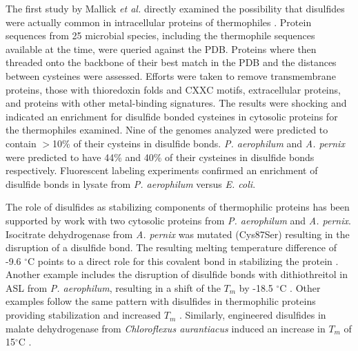 The first study by Mallick \emph{et al.} directly examined the possibility that
disulfides were actually common in intracellular proteins of thermophiles
\cite{mallick2002gei}.  Protein sequences from 25 microbial species, including
the thermophile sequences available at the time, were queried against the PDB.
Proteins where then threaded onto the backbone of their best match in the PDB
and the distances between cysteines were assessed.  Efforts were taken to
remove transmembrane proteins, those with thioredoxin folds and CXXC motifs,
extracellular proteins, and proteins with other metal-binding signatures.  The
results were shocking and indicated an enrichment for disulfide bonded
cysteines in cytosolic proteins for the thermophiles examined.  Nine of the
genomes analyzed were predicted to contain $>$10\% of their cysteins in
disulfide bonds.  \emph{P. aerophilum} and \emph{A.  pernix} were predicted to
have 44\% and 40\% of their cysteines in disulfide bonds respectively.
Fluorescent labeling experiments confirmed an enrichment of disulfide bonds in
lysate from \emph{P.  aerophilum} versus \emph{E. coli}.


The role of disulfides as stabilizing components of thermophilic proteins has
been supported by work with two cytosolic proteins from \emph{P. aerophilum}
and \emph{A. pernix}.  Isocitrate dehydrogenase from \emph{A. pernix} was
mutated (Cys87Ser) resulting in the disruption of a disulfide bond.  The
resulting melting temperature difference of -9.6 $^\circ$C points to a direct
role for this covalent bond in stabilizing the protein \cite{karlstrom2005idh}.
Another example includes the disruption of disulfide bonds with dithiothreitol
in ASL from \emph{P.  aerophilum}, resulting in a shift of the ${T }_{m }$ by
-18.5 $^\circ$C \cite{toth2000sal}.  Other examples follow the same pattern
with disulfides in thermophilic proteins providing stabilization and increased
${T }_{m }$ \cite{ladenstein2006pda}.  Similarly, engineered disulfides in
malate dehydrogenase from \emph{Chloroflexus aurantiacus} induced an increase
in ${T }_{m }$ of 15$^\circ$C \cite{bjork2004lit}.

